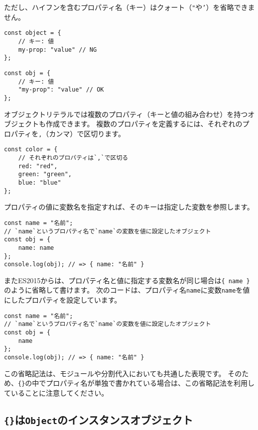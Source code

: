 ただし、ハイフンを含むプロパティ名（キー）はクォート（\texttt{"}や\texttt{'}）を省略できません。

\begin{lstlisting}
const object = {
    // キー: 値
    my-prop: "value" // NG
};
\end{lstlisting}

\begin{lstlisting}
const obj = {
    // キー: 値
    "my-prop": "value" // OK
};
\end{lstlisting}

オブジェクトリテラルでは複数のプロパティ（キーと値の組み合わせ）を持つオブジェクトも作成できます。
複数のプロパティを定義するには、それぞれのプロパティを\texttt{,}（カンマ）で区切ります。

\begin{lstlisting}
const color = {
    // それぞれのプロパティは`,`で区切る
    red: "red",
    green: "green",
    blue: "blue"
};
\end{lstlisting}

プロパティの値に変数名を指定すれば、そのキーは指定した変数を参照します。

\begin{lstlisting}
const name = "名前";
// `name`というプロパティ名で`name`の変数を値に設定したオブジェクト
const obj = {
    name: name
};
console.log(obj); // => { name: "名前" }
\end{lstlisting}

またES2015からは、プロパティ名と値に指定する変数名が同じ場合は\texttt{\{ name \}}のように省略して書けます。
次のコードは、プロパティ名\texttt{name}に変数\texttt{name}を値にしたプロパティを設定しています。

\begin{lstlisting}
const name = "名前";
// `name`というプロパティ名で`name`の変数を値に設定したオブジェクト
const obj = {
    name
};
console.log(obj); // => { name: "名前" }
\end{lstlisting}

この省略記法は、モジュールや分割代入においても共通した表現です。
そのため、\texttt{\{\}}の中でプロパティ名が単独で書かれている場合は、この省略記法を利用していることに注意してください。

\hypertarget{object-instance-object}{%
\subsection{\texorpdfstring{\texttt{\{\}}は\texttt{Object}のインスタンスオブジェクト}{\{\}はObjectのインスタンスオブジェクト}}\label{object-instance-object}}

